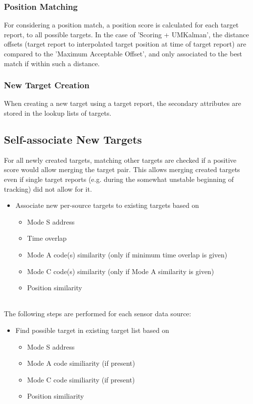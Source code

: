 \begin{itemize}
\subsubsection{Position Matching}

For considering a position match, a position score is calculated for each target report, to all possible targets. In the case of 'Scoring + UMKalman', the distance offsets (target report to interpolated target position at time of target report) are compared to the 'Maximum Acceptable Offset', and only associated to the best match if within such a distance.

\subsubsection{New Target Creation}

When creating a new target using a target report, the secondary attributes are stored in the lookup lists of targets.

\subsection{Self-associate New Targets}

For all newly created targets, matching other targets are checked if a positive score would allow merging the target pair. This allows merging created targets even if single target reports (e.g. during the somewhat unstable beginning of tracking) did not allow for it.

\begin{itemize}
\item Associate new per-source targets to existing targets based on
\begin{itemize}
\item Mode S address
\item Time overlap
\item Mode A code(s) similarity (only if minimum time overlap is given)
\item Mode C code(s) similarity (only if Mode A similarity is given)
\item Position similarity
\end{itemize}
\end{itemize}
\ \\


The following steps are performed for each sensor data source:
\begin{itemize}
\item Find possible target in existing target list based on
\begin{itemize}
\item Mode S address
\item Mode A code similiarity (if present)
\item Mode C code similiarity (if present)
\item Position similiarity
\end{itemize}

\end{itemize}
\end{itemize}
\ \\


